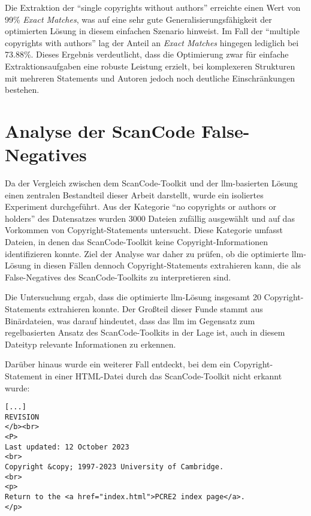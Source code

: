 Die Extraktion der \enquote{single copyrights without authors} erreichte einen Wert von \num{99}\% \textit{Exact Matches}, was auf eine sehr gute Generalisierungsfähigkeit der optimierten Lösung in diesem einfachen Szenario hinweist.
Im Fall der \enquote{multiple copyrights with authors} lag der Anteil an \textit{Exact Matches} hingegen lediglich bei \num{73.88}\%.
Dieses Ergebnis verdeutlicht, dass die Optimierung zwar für einfache Extraktionsaufgaben eine robuste Leistung erzielt, bei komplexeren Strukturen mit mehreren Statements und Autoren jedoch noch deutliche Einschränkungen bestehen.


\section{Analyse der ScanCode False-Negatives}

Da der Vergleich zwischen dem ScanCode-Toolkit und der \gls{llm}-basierten Lösung einen zentralen Bestandteil dieser Arbeit darstellt, wurde ein isoliertes Experiment durchgeführt.
Aus der Kategorie \enquote{no copyrights or authors or holders} des Datensatzes wurden \num{3000} Dateien zufällig ausgewählt und auf das Vorkommen von Copyright-Statements untersucht.
Diese Kategorie umfasst Dateien, in denen das ScanCode-Toolkit keine Copyright-Informationen identifizieren konnte.
Ziel der Analyse war daher zu prüfen, ob die optimierte \gls{llm}-Lösung in diesen Fällen dennoch Copyright-Statements extrahieren kann, die als False-Negatives des ScanCode-Toolkits zu interpretieren sind.

Die Untersuchung ergab, dass die optimierte \gls{llm}-Lösung insgesamt \num{20} Copyright-Statements extrahieren konnte.
Der Großteil dieser Funde stammt aus Binärdateien, was darauf hindeutet, dass das \gls{llm} im Gegensatz zum regelbasierten Ansatz des ScanCode-Toolkits in der Lage ist, auch in diesem Dateityp relevante Informationen zu erkennen.

Darüber hinaus wurde ein weiterer Fall entdeckt, bei dem ein Copyright-Statement in einer HTML-Datei durch das ScanCode-Toolkit nicht erkannt wurde:

\begin{lstlisting}[keepspaces=true]
[...]
REVISION
</b><br>
<P>
Last updated: 12 October 2023
<br>
Copyright &copy; 1997-2023 University of Cambridge.
<br>
<p>
Return to the <a href="index.html">PCRE2 index page</a>.
</p>
\end{lstlisting}

